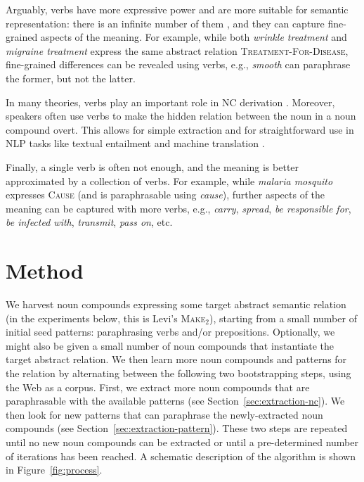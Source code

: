 \documentclass[letterpaper,11pt]{article}
\newcommand{\secref}[2][]{Section#1~\ref{#2}\xspace}
\newcommand{\figref}[2][]{Figure#1~\ref{#2}\xspace}
\begin{document}
Arguably, verbs have more expressive power and are more suitable for semantic representation:
there is an infinite number of them \cite{downing:1977:nc:sem},
and they can capture fine-grained aspects of the meaning. For example,
while both {\it wrinkle  treatment} and  {\it migraine  treatment} express
the  same abstract  relation \textsc{Treatment-For-Disease},
fine-grained differences can be revealed using verbs,
e.g., {\it  smooth} can paraphrase the former, but not the latter.

In many theories, verbs play an  important role in NC derivation  \cite{Levi:1978}.
Moreover, speakers often use verbs to make the hidden relation between the noun in a noun compound overt.
This allows for simple  extraction and for straightforward use
in NLP tasks like textual entailment \cite{Tatu:Moldovan:2005:entailment}
and machine translation \cite{Nakov:2008:ECAI}.

Finally, a single verb is often not enough,
and the meaning is better approximated by  a collection of verbs. For example,
while {\it malaria  mosquito} expresses \textsc{Cause}
(and is paraphrasable using {\it cause}),  further aspects of the meaning can  be captured
with more verbs, e.g., {\it carry}, {\it spread}, {\it be responsible for},
{\it be infected  with}, {\it transmit},  {\it pass on}, etc.



\section{Method}
\label{sec:method}

We   harvest   noun   compounds  expressing   some   target   abstract
semantic  relation   (in  the  experiments  below,   this  is  Levi's
\textsc{Make$_2$}),  starting  from a  small  number  of initial  seed
patterns: paraphrasing  verbs and/or prepositions. Optionally,  we might
also  be given  a  small  number of  noun  compounds that  instantiate
the  target   abstract relation.  We  then   learn  more  noun   compounds  and
patterns  for  the  relation  by  alternating  between  the  following
two  bootstrapping  steps,  using  the  Web as  a  corpus.  First,  we
extract more noun compounds that  are paraphrasable with the available
patterns  (see  \secref{sec:extraction-nc}).  We  then  look  for  new
patterns that  can paraphrase the newly-extracted  noun compounds (see
\secref{sec:extraction-pattern}). These  two steps are  repeated until
no  new noun  compounds can  be  extracted or  until a  pre-determined
number of iterations has been  reached. A schematic description of the
algorithm is shown in \figref{fig:process}.
\end{document}
